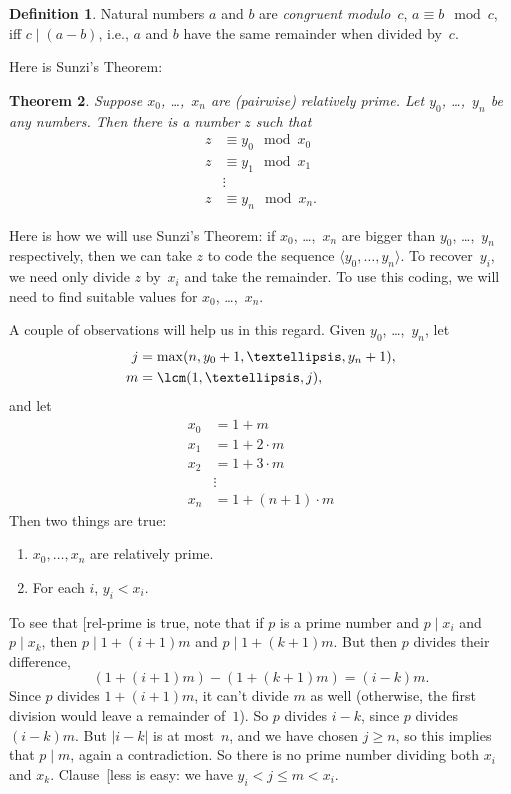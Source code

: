 \documentclass[10pt,a4paper]{article}
\makeatletter
\theoremstyle{plain}
\newtheorem{thm}{Theorem}[section]
\theoremstyle{definition}
\newtheorem{defn}[thm]{Definition}
\theoremstyle{remark}
\newcommand*{\ollabel}[1]{\label{#1}}
\newcommand{\olref}{\@ifnextchar[{\olref@i}{\olref@final}}
\def\olref@i[#1]{\@ifnextchar[{\olref@ii}{\olref@final}}
\def\olref@ii[#1]{\@ifnextchar[{\olref@iii}{\olref@final}}
\def\olref@iii[#1]{\olref@final}
\def\olref@final#1{\ref{#1}}
\providecommand{\tuple}[1]{\langle #1 \rangle}
\makeatother
\begin{document}
\begin{defn}
Natural numbers $a$ and $b$ are \emph{congruent modulo~$c$},
$a \equiv b \mod c$, iff $c \mid (a-b)$, i.e., $a$ and $b$ have the
same remainder when divided by~$c$.
\end{defn}

Here is Sunzi's Theorem:
\begin{thm}
Suppose $x_0$, \dots,~$x_n$ are (pairwise) relatively prime. Let
$y_0$, \dots,~$y_n$ be any numbers. Then there is a number $z$ such that
\begin{align*}
z & \equiv y_0 \mod x_0 \\
z & \equiv y_1 \mod x_1 \\
& \vdots  \\
z & \equiv y_n \mod x_n.
\end{align*}
\end{thm}

Here is how we will use Sunzi's Theorem: if $x_0$,
\dots,~$x_n$ are bigger than $y_0$, \dots,~$y_n$ respectively, then we
can take $z$ to code the sequence $\tuple{y_0, \dots,y_n}$. To
recover~$y_i$, we need only divide $z$ by~$x_i$ and take the
remainder. To use this coding, we will need to find suitable values
for $x_0$, \dots,~$x_n$.

A couple of observations will help us in this regard. Given
$y_0$, \dots,~$y_n$, let
\begin{align*}
j &= \max(n, y_0 + 1, \dots, y_n + 1), \\
m &= \lcm(1,\dots,j),
\end{align*}
and let
\begin{align*}
x_0 & = 1 + m \\
x_1 & = 1 + 2 \cdot m \\
x_2 & = 1 + 3 \cdot m \\
& \vdots  \\
x_n & = 1 + (n+1) \cdot m
\end{align*}
Then two things are true:
\begin{enumerate}
\item\ollabel{rel-prime} $x_0,\dots,x_n$ are relatively prime.
\item\ollabel{less} For each $i$, $y_i < x_i$.
\end{enumerate}
To see that \olref{rel-prime} is true, note that if $p$ is a prime number
and $p \mid x_i$ and $p \mid x_k$, then $p \mid 1 + (i+1) m$ and
$p \mid 1 + (k+1) m$. But then $p$ divides their difference,
\[
(1 + (i+1)m) - (1+ (k+1)m) = (i-k) m.
\]
Since $p$ divides $1 + (i+1)m$, it can't divide $m$ as well
(otherwise, the first division would leave a remainder of~$1$). So $p$
divides $i-k$, since $p$ divides $(i-k)m$. But $\left|i-k\right|$ is at
most~$n$, and we have chosen $j \geq n$, so this implies that
$p \mid m$, again a contradiction. So there is no prime number dividing
both $x_i$ and $x_k$. Clause~\olref{less} is easy:
we have $y_i < j \leq m < x_i$.
\end{document}
